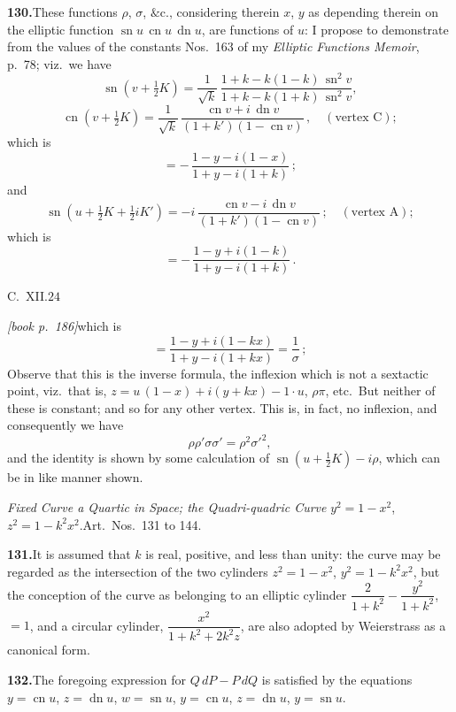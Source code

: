 \documentclass[11pt,a4paper]{article}
\DeclareMathOperator{\sn}{sn}
\DeclareMathOperator{\cn}{cn}
\DeclareMathOperator{\dn}{dn}
\begin{document}
\medskip\noindent\textbf{130.}\quad These functions $\rho$, $\sigma$, $\&$c., considering therein $x$, $y$ as depending therein on the elliptic function $\sn u\,\cn u\,\dn u$, are functions of $u$: I propose to demonstrate from the values of the constants Nos.\ 163 of my \textit{Elliptic Functions Memoir}, p.\ 78; viz.\ we have
\[
\sn(v + \tfrac{1}{2}K) = \frac{1}{\sqrt{k}}\,\frac{1 + k - k(1 - k)\,\sn^2 v}{1 + k - k(1 + k)\,\sn^2 v},
\]
\[
\cn(v + \tfrac{1}{2}K) = \frac{1}{\sqrt{k}}\,\frac{\cn v + i\,\dn v}{(1 + k')(1 - \cn v)}\,,\quad(\text{vertex C});
\]
which is
\[
= -\,\frac{1 - y - i(1 - x)}{1 + y - i(1 + k)}\,;
\]
and
\[
\sn(u + \tfrac{1}{2}K + \tfrac{1}{2}iK') = -i\,\dfrac{\cn v - i\,\dn v}{(1 + k')(1 - \cn v)}\,;\quad(\text{vertex A});
\]
which is
\[
= -\,\frac{1 - y + i(1 - k)}{1 + y - i(1 + k)}\,.
\]

\hfill C.\ XII.\hfill $24$

\medskip\noindent\textit{[book p.~186]}\quad which is
\[
= \frac{1 - y + i(1 - kx)}{1 + y - i(1 + kx)} = \frac{1}{\sigma}\,;
\]
Observe that this is the inverse formula, the inflexion which is not a sextactic point, viz.\ that is, $z = u\,(1 - x) + i(y + kx) - 1 \cdot u$, $\rho \pi$, etc.\ But neither of these is constant; and so for any other vertex. This is, in fact, no inflexion, and consequently we have
\[
\rho\rho'\sigma\sigma' = \rho^2\sigma'^2,
\]
and the identity is shown by some calculation of $\sn(u + \tfrac{1}{2}K) - i\rho$, which can be in like manner shown.

\medskip\noindent\textit{Fixed Curve a Quartic in Space; the Quadri-quadric Curve} $y^2 = 1 - x^2$, $z^2 = 1 - k^2 x^2$.\quad Art.\ Nos.\ 131 to 144.

\medskip\noindent\textbf{131.}\quad It is assumed that $k$ is real, positive, and less than unity: the curve may be regarded as the intersection of the two cylinders $z^2 = 1 - x^2$, $y^2 = 1 - k^2 x^2$, but the conception of the curve as belonging to an elliptic cylinder $\dfrac{2}{1 + k^2} - \dfrac{y^2}{1 + k^2}$, $= 1$, and a circular cylinder, $\dfrac{x^2}{1 + k^2 + 2k^2 z}$, are also adopted by Weierstrass as a canonical form.

\medskip\noindent\textbf{132.}\quad The foregoing expression for $Q\,dP - P\,dQ$ is satisfied by the equations $y = \cn u$, $z = \dn u$, $w = \sn u$, $y = \cn u$, $z = \dn u$, $y = \sn u$.
\end{document}
